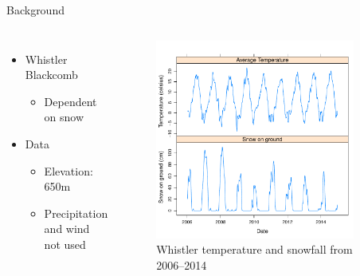 \documentclass{beamer}
\begin{document}
\begin{frame}{Background}


\begin{columns}


{\small
\begin{itemize}
\item Whistler Blackcomb
\begin{itemize} 
\item Dependent on snow
\end{itemize}
\item Data
\begin{itemize}
\item Elevation: 650m
\item Precipitation and wind not used
\end{itemize}
\end{itemize}
}

\vspace{30mm}


\vspace{-18mm}
\begin{figure}
\includegraphics[width=0.9\textwidth]{report-basicts}
\vspace{-2mm}
\caption{{\footnotesize Whistler temperature and snowfall from 2006--2014}}
\vspace{10mm}
\end{figure}

\end{columns}

\end{frame}
\end{document}
